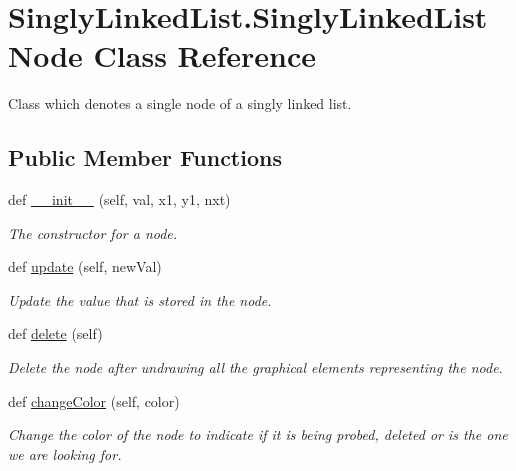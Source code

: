 \hypertarget{class_singly_linked_list_1_1_singly_linked_list_node}{}\section{Singly\+Linked\+List.\+Singly\+Linked\+List\+Node Class Reference}
\label{class_singly_linked_list_1_1_singly_linked_list_node}


Class which denotes a single node of a singly linked list.  


\subsection*{Public Member Functions}
\begin{DoxyCompactItemize}
\item 
def \hyperlink{class_singly_linked_list_1_1_singly_linked_list_node_a7dc5e943f0780eb94e10a3e127e9981e}{\+\_\+\+\_\+init\+\_\+\+\_\+} (self, val, x1, y1, nxt)
\begin{DoxyCompactList}\small\item\em The constructor for a node. \end{DoxyCompactList}\item 
def \hyperlink{class_singly_linked_list_1_1_singly_linked_list_node_aa68f8ef3332faaa7d105f0ee6a26537f}{update} (self, new\+Val)
\begin{DoxyCompactList}\small\item\em Update the value that is stored in the node. \end{DoxyCompactList}\item 
def \hyperlink{class_singly_linked_list_1_1_singly_linked_list_node_a0acea59e6b0d5b52205ebdedcba44d31}{delete} (self)
\begin{DoxyCompactList}\small\item\em Delete the node after undrawing all the graphical elements representing the node. \end{DoxyCompactList}\item 
def \hyperlink{class_singly_linked_list_1_1_singly_linked_list_node_a0b8e7f821c47733bed23ba4acca433ce}{change\+Color} (self, color)
\begin{DoxyCompactList}\small\item\em Change the color of the node to indicate if it is being probed, deleted or is the one we are looking for. \end{DoxyCompactList}\item 

\end{DoxyCompactItemize}
